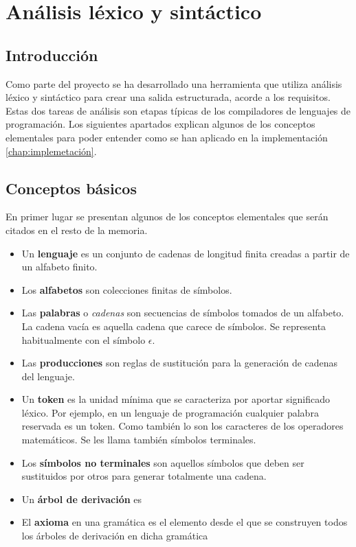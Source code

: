 \section{Análisis léxico y sintáctico}

\subsection{Introducción}

Como parte del proyecto se ha desarrollado una herramienta que utiliza análisis léxico y sintáctico para crear una salida estructurada, acorde a los requisitos. Estas dos tareas de análisis son etapas típicas de los compiladores de lenguajes de programación. Los siguientes apartados explican algunos de los conceptos elementales para poder entender como se han aplicado en la implementación \ref{chap:implemetación}.

\subsection{Conceptos básicos}

En primer lugar se presentan algunos de los conceptos elementales que serán citados en el resto de la memoria.

\begin{itemize}
    \item Un \textbf{lenguaje} es un conjunto de cadenas de longitud finita creadas a partir de un alfabeto finito.
    \item Los \textbf{alfabetos} son colecciones finitas de símbolos.
    \item Las \textbf{palabras} o \emph{cadenas} son secuencias de símbolos tomados de un alfabeto. La cadena vacía es aquella cadena que carece de símbolos. Se representa habitualmente con el símbolo $\epsilon$.
    \item Las \textbf{producciones} son reglas de sustitución para la generación de cadenas del lenguaje.
    \item Un \textbf{token} es la unidad mínima que se caracteriza por aportar significado léxico. Por ejemplo, en un lenguaje de programación cualquier palabra reservada es un token. Como también lo son los caracteres de los operadores matemáticos. Se les llama también símbolos terminales.
    \item Los \textbf{símbolos no terminales} son aquellos símbolos que deben ser sustituidos por otros para generar totalmente una cadena.
    \item Un \textbf{árbol de derivación} es
    \item El \textbf{axioma} en una gramática es el elemento desde el que se construyen todos los árboles de derivación en dicha gramática

\end{itemize}

